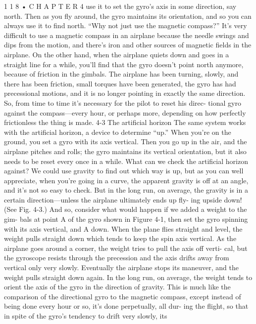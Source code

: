 \documentclass[10pt,oneside]{article}
\begin{document}
1 1 8 • C H A P T E R  4 use it to set the gyro’s axis in some direction, say north. Then as you fly around, the gyro maintains its orientation, and so you can always use it to find north. “Why not just use the magnetic compass?” It’s very difficult to use a magnetic compass in an airplane because the needle swings and dips from the motion, and there’s iron and other sources of magnetic fields in the airplane. On the other hand, when the airplane quiets down and goes in a straight line for a while, you’ll find that the gyro doesn’t point north anymore, because of friction in the gimbals. The airplane has been turning, slowly, and there has been friction, small torques have been generated, the gyro has had precessional motions, and it is no longer pointing in exactly the same direction. So, from time to time it’s necessary for the pilot to reset his direc- tional gyro against the compass---every hour, or perhaps more, depending on how perfectly frictionless the thing is made. 4-3 The artificial horizon The same system works with the artificial horizon, a device to determine “up.” When you’re on the ground, you set a gyro with its axis vertical. Then you go up in the air, and the airplane pitches and rolls; the gyro maintains its vertical orientation, but it also needs to be reset every once in a while. What can we check the artificial horizon against? We could use gravity to find out which way is up, but as you can well appreciate, when you’re going in a curve, the apparent gravity is off at an angle, and it’s not so easy to check. But in the long run, on average, the gravity is in a certain direction---unless the airplane ultimately ends up fly- ing upside down! (See Fig. 4-3.) And so, consider what would happen if we added a weight to the gim- bals at point A of the gyro shown in Figure 4-1, then set the gyro spinning with its axis vertical, and A down. When the plane flies straight and level, the weight pulls straight down which tends to keep the spin axis vertical. As the airplane goes around a corner, the weight tries to pull the axis off verti- cal, but the gyroscope resists through the precession and the axis drifts away from vertical only very slowly. Eventually the airplane stops its maneuver, and the weight pulls straight down again. In the long run, on average, the weight tends to orient the axis of the gyro in the direction of gravity. This is much like the comparison of the directional gyro to the magnetic compass, except instead of being done every hour or so, it’s done perpetually, all dur- ing the flight, so that in spite of the gyro’s tendency to drift very slowly, its\par
\end{document}
